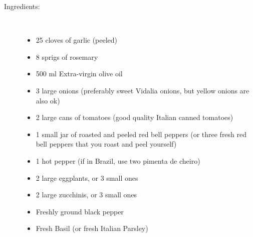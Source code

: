 \documentclass [11pt, letterpaper] {article}
\begin{document}
\begin{description}

\item[Ingredients:]\ \\
	\begin{itemize}
	\item 25 cloves of garlic (peeled)
	\item 8 sprigs of rosemary
	\item 500 ml Extra-virgin olive oil
	\item 3 large onions (preferably sweet Vidalia onions, but yellow onions are also ok)
	\item 2 large cans of tomatoes (good quality Italian canned tomatoes) 
	\item 1 small jar of roasted and peeled red bell peppers (or three fresh red bell peppers that you roast and peel yourself) 
	\item 1 hot pepper (if in Brazil, use two pimenta de cheiro)
	\item 2 large eggplants, or 3 small ones
	\item 2 large zucchinis, or 3 small ones 
	\item Freshly ground black pepper
	\item Fresh Basil (or fresh Italian Parsley)
	\end{itemize}


\end{description}
\end{document}
